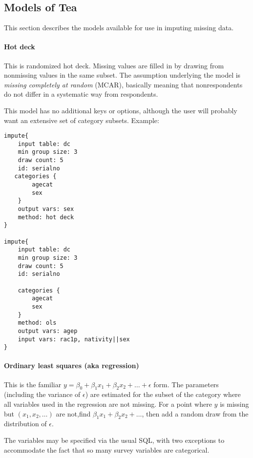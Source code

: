 \documentclass{article}
\begin{document}
\subsection{Models of Tea} This section describes the models available for use in imputing
missing data.

\paragraph{Hot deck} This is randomized hot deck. Missing values are filled in by
drawing from nonmissing values in the same subset. The assumption underlying the model
is {\em missing completely at random} (MCAR), basically meaning that nonrespondents
do not differ in a systematic way from respondents.

This model has no additional keys or options, although the user will probably want an
extensive set of category subsets. Example:

\begin{lstlisting}
impute{
    input table: dc
    min group size: 3
    draw count: 5
    id: serialno
   categories {
        agecat
        sex
    }
    output vars: sex
    method: hot deck
}

impute{
    input table: dc
    min group size: 3
    draw count: 5
    id: serialno

    categories {
        agecat
        sex
    }
    method: ols
    output vars: agep
    input vars: rac1p, nativity||sex
}
\end{lstlisting}

\paragraph{Ordinary least squares (aka regression)}  This is the familiar $y = \beta_0
+ \beta_1 x_1  + \beta_2 x_2 + \dots +\epsilon$ form. The parameters (including the
variance of $\epsilon$) are estimated for the subset of the category where all variables
used in the regression are not missing. For a point where $y$ is missing but $(x_1, x_2, \dots)$ are not,find $\beta_1 x_1  + \beta_2 x_2 + \dots$, then add a random draw from the distribution of $\epsilon$.

The variables may be specified via the usual SQL, with two exceptions to accommodate the
fact that so many survey variables are categorical.
\end{document}
